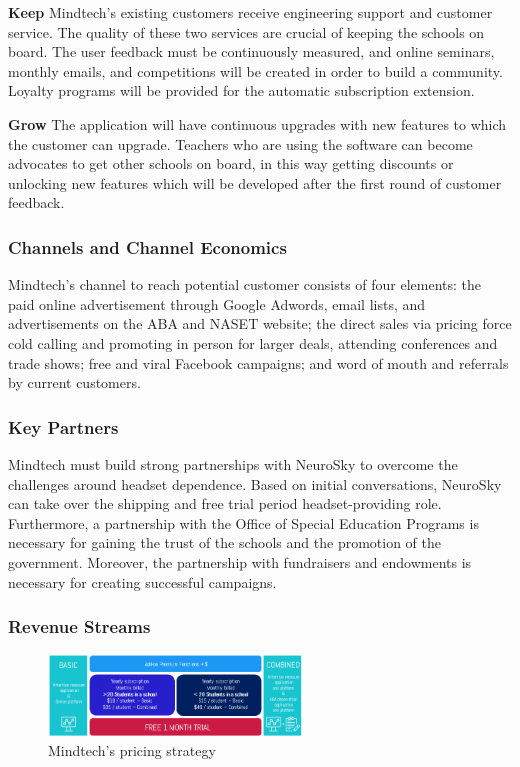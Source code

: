 \documentclass[letterpaper,10pt]{article}
\begin{document}
\textbf{Keep} Mindtech’s existing customers receive engineering support and customer service. The quality of these two services are crucial of keeping the schools on board. The user feedback must be continuously measured, and online seminars, monthly emails, and competitions will be created in order to build a community. Loyalty programs will be provided for the automatic subscription extension.

\textbf{Grow} The application will have continuous upgrades with new features to which the customer can upgrade. Teachers who are using the software can become advocates to get other schools on board, in this way getting discounts or unlocking new features which will be developed after the first round of customer feedback. 



\subsubsection{Channels and Channel Economics}

Mindtech's channel to reach potential customer consists of four elements: the paid online advertisement through Google Adwords, email lists, and advertisements on the ABA and NASET website; the direct sales via pricing force cold calling and promoting in person for larger deals, attending conferences and trade shows; free and viral Facebook campaigns; and word of mouth and referrals by current customers. 


\subsubsection{Key Partners}

Mindtech must build strong partnerships with NeuroSky to overcome the challenges around headset dependence. Based on initial conversations, NeuroSky can take over the shipping and free trial period headset-providing role. Furthermore, a partnership with the Office of Special Education Programs is necessary for gaining the trust of the schools and the promotion of the government. Moreover, the partnership with fundraisers and endowments is necessary for creating successful campaigns.


\subsubsection{Revenue Streams}

\begin{figure}
\centering
\includegraphics[width=0.6\textwidth]{coststructure.PNG}
\caption{Mindtech's pricing strategy}
\label{img:coststructure}
\end{figure}
\end{document}
